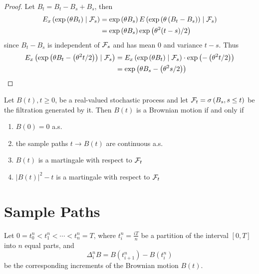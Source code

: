 \begin{proof}
	Let \(B_{t}=B_{t}-B_{s}+B_{s}\), then
	\begin{equation*}
		\begin{aligned}
			E_{x}\left(\exp\left(\theta B_{t}\right)\mid\mathcal{F}_{s}\right) & =\exp \left(\theta B_{s}\right)E\left(\exp\left(\theta\left(B_{t}-B_{s}\right)\right)\mid\mathcal{F}_{s}\right) \\
			                                                            & =\exp\left(\theta B_{s}\right)\exp\left(\theta^{2}(t-s)/2\right)
		\end{aligned}
	\end{equation*}
	since \(B_{t}-B_{s}\) is independent of \(\mathcal{F}_{s}\) and has mean 0 and variance \(t-s\). Thus
	\begin{equation*}
		\begin{aligned}
			E_{x}\left(\exp\left(\theta B_{t}-\left(\theta^{2}t/2\right)\right)\mid\mathcal{F}_{s}\right) & =E_{x}\left(\exp\left(\theta B_{t}\right)\mid\mathcal{F}_{s}\right)\cdot\exp\left(-\left(\theta^{2}t/2\right)\right) \\
			                                                                                       & =\exp\left(\theta B_{s}-\left(\theta^{2}s/2\right)\right)
		\end{aligned}
	\end{equation*}
\end{proof}

\begin{theorem}
	Let \(B(t),t\geq 0\), be a real-valued stochastic process and let \(\mathcal{F}_{t}=\sigma\left(B_{s},s\leq t\right)\) be the filtration generated by it. Then \(B(t)\) is a Brownian motion if and only if
	\begin{enumerate}
		\item \(B(0)=0\) a.s.
		\item the sample paths \(t\rightarrow B(t)\) are continuous a.s.
		\item \(B(t)\) is a martingale with respect to \(\mathcal{F}_{t}\)
		\item \(|B(t)|^{2}-t\) is a martingale with respect to \(\mathcal{F}_{t}\)
	\end{enumerate}
\end{theorem}

\section{Sample Paths}

Let \(0=t_{0}^{n}<t_{1}^{n}<\cdots<t_{n}^{n}=T\), where \(t_{i}^{n}=\frac{iT}{n}\) be a partition of the interval \([0,T]\) into \(n\) equal parts, and
\begin{equation}
	\Delta_{i}^{n}B=B\left(t_{i+1}^{n}\right)-B\left(t_{i}^{n}\right)
\end{equation}
be the corresponding increments of the Brownian motion \(B(t)\).

